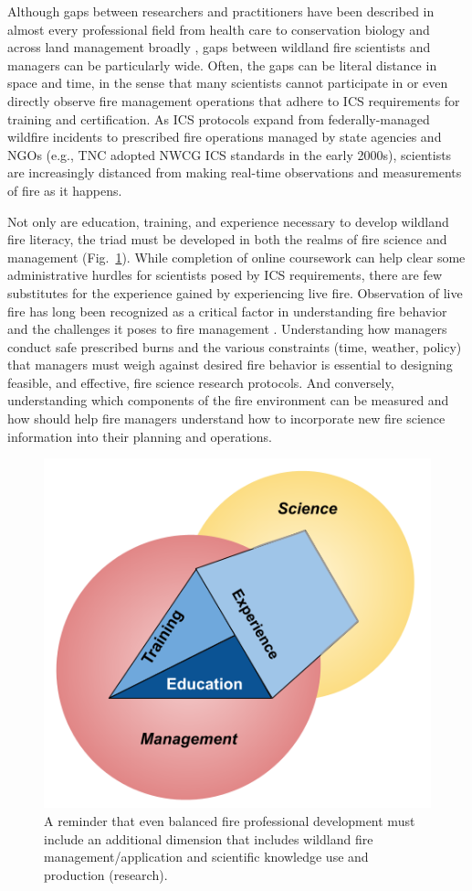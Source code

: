 \documentclass[fire,article,submit,moreauthors,pdftex]{Definitions/mdpi}
\begin{document}
Although gaps between researchers and practitioners have been described in almost every professional field from health care to conservation biology \citep{stott2012, prendergast1999} and across land management broadly \citep{carter2020}, gaps between wildland fire scientists and managers can be particularly wide.
Often, the gaps can be literal distance in space and time, in the sense that many scientists cannot participate in or even directly observe fire management operations that adhere to ICS requirements for training and certification.
As ICS protocols expand from federally-managed wildfire incidents to prescribed fire operations managed by state agencies and NGOs (e.g., TNC adopted NWCG ICS standards in the early 2000s), scientists are increasingly distanced from making real-time observations and measurements of fire as it happens.

Not only are education, training, and experience necessary to develop wildland fire literacy, the triad must be developed in both the realms of fire science and management (Fig.~\ref{ScienceManagement}).
While completion of online coursework can help clear some administrative hurdles for scientists posed by ICS requirements, there are few substitutes for the experience gained by experiencing live fire.
Observation of live fire has long been recognized as a critical factor in understanding fire behavior and the challenges it poses to fire management \citep{alexander1990, andrews1989}.
Understanding how managers conduct safe prescribed burns and the various constraints (time, weather, policy) that managers must weigh against desired fire behavior is essential to designing feasible, and effective, fire science research protocols.
And conversely, understanding which components of the fire environment can be measured and how should help fire managers understand how to incorporate new fire science information into their planning and operations.

\begin{figure}
\centering
\includegraphics[width=0.5\columnwidth]{ScienceManagementTent.png}
\caption{\label{ScienceManagement}A reminder that even balanced fire professional development must include an additional dimension that includes wildland fire management/application and scientific knowledge use and production (research).}
\end{figure}
\end{document}
